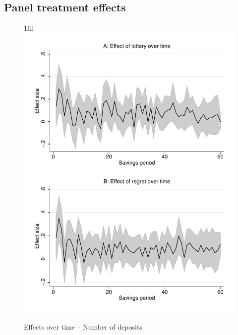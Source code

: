 \documentclass[11pt]{article}
\makeatletter
\newcommand*{\centerfloat}{%
  \parindent \z@
  \leftskip \z@ \@plus 1fil \@minus \textwidth
  \rightskip\leftskip
  \parfillskip \z@skip}
\makeatother
\begin{document}
	\clearpage

	\subsection{Panel treatment effects}

        \begin{figure}[h]
        \centering
        \caption{Effects over time -- Number of deposits}
        \centerfloat
        \includegraphics[width=\textwidth]{../../figures/line-timemobile_deposits.pdf}
        \end{figure}
\end{document}
